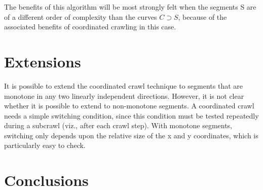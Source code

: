 The benefits of this algorithm will be most strongly felt when the segments S are of 
a different order of complexity than the curves $C \supset S$, because
of the associated benefits of coordinated crawling in this case.


%
%
%
%

\section{Extensions}

It is possible to extend the coordinated crawl technique to
segments that are monotone in any two linearly independent directions.
However, it is not clear whether it is possible to extend to non-monotone
segments.
A coordinated crawl needs a simple switching condition, since this condition
must be tested repeatedly during a subcrawl (viz., after each crawl step).
With monotone segments, switching only depends upon the relative size of the
x and y coordinates, which is particularly easy to check.

\section{Conclusions}

